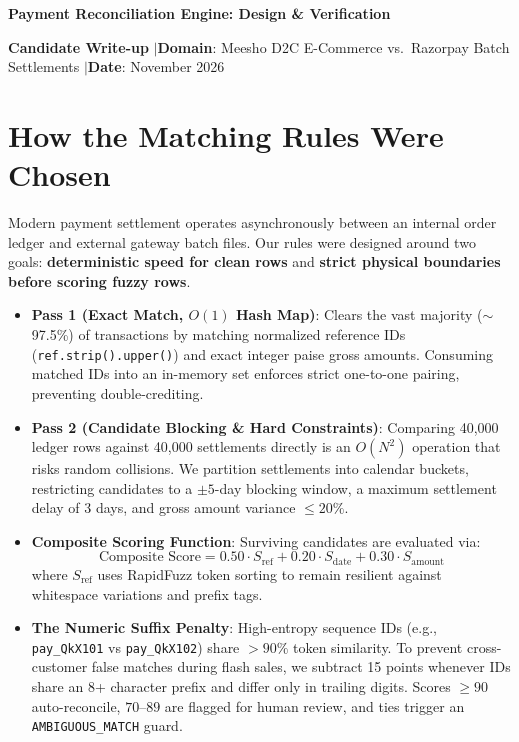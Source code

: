 \documentclass[10pt,a4paper]{article}
\begin{document}
{\color{primary}\fontsize{14pt}{16pt}\bfseries Payment Reconciliation Engine: Design \& Verification}
\vspace{1.5pt}

{\color{bodytext}\fontsize{8.5pt}{10.5pt}\selectfont
\textbf{Candidate Write-up} \quad$\vert$\quad \textbf{Domain}: Meesho D2C E-Commerce vs.\ Razorpay Batch Settlements \quad$\vert$\quad \textbf{Date}: November 2026
}
\vspace{4pt}
\color{bodytext}\fontsize{9.2pt}{11.5pt}\selectfont

\section{How the Matching Rules Were Chosen}
Modern payment settlement operates asynchronously between an internal order ledger and external gateway batch files. Our rules were designed around two goals: \textbf{deterministic speed for clean rows} and \textbf{strict physical boundaries before scoring fuzzy rows}.

\begin{itemize}
    \item \textbf{Pass 1 (Exact Match, $O(1)$ Hash Map)}: Clears the vast majority ($\sim$97.5\%) of transactions by matching normalized reference IDs (\texttt{ref.strip().upper()}) and exact integer paise gross amounts. Consuming matched IDs into an in-memory set enforces strict one-to-one pairing, preventing double-crediting.
    \item \textbf{Pass 2 (Candidate Blocking \& Hard Constraints)}: Comparing 40,000 ledger rows against 40,000 settlements directly is an $O(N^2)$ operation that risks random collisions. We partition settlements into calendar buckets, restricting candidates to a $\pm 5$-day blocking window, a maximum settlement delay of 3 days, and gross amount variance $\le 20\%$.
    \item \textbf{Composite Scoring Function}: Surviving candidates are evaluated via:
    $$\text{Composite Score} = 0.50 \cdot S_{\text{ref}} + 0.20 \cdot S_{\text{date}} + 0.30 \cdot S_{\text{amount}}$$
    where $S_{\text{ref}}$ uses RapidFuzz token sorting to remain resilient against whitespace variations and prefix tags.
    \item \textbf{The Numeric Suffix Penalty}: High-entropy sequence IDs (e.g., \texttt{pay\_QkX101} vs \texttt{pay\_QkX102}) share $>90\%$ token similarity. To prevent cross-customer false matches during flash sales, we subtract 15 points whenever IDs share an 8+ character prefix and differ only in trailing digits. Scores $\ge 90$ auto-reconcile, $70$--$89$ are flagged for human review, and ties trigger an \texttt{AMBIGUOUS\_MATCH} guard.
\end{itemize}
\end{document}

